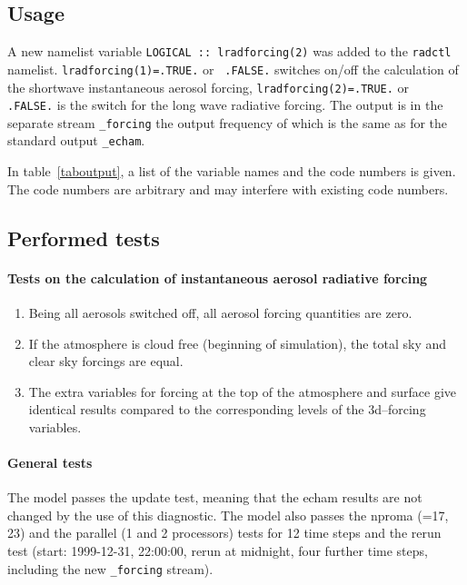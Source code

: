 \begin{appendix}
\subsection{Usage}

A new namelist variable {\tt LOGICAL :: lradforcing(2)} was added 
to the {\tt radctl} namelist. {\tt lradforcing(1)=.TRUE.} or {\tt
  .FALSE.} switches on/off the calculation of the shortwave
instantaneous aerosol forcing, {\tt lradforcing(2)=.TRUE.} or {\tt
  .FALSE.} is the switch for the long wave radiative forcing.
The output is in the separate stream {\tt \_forcing} the output
frequency of which is the same as for the standard output {\tt \_echam}.

In table~\ref{taboutput}, a list of the variable names and the code
numbers is given. The code numbers are arbitrary and may interfere
with existing code numbers.

\subsection{Performed tests}

\paragraph{Tests on the calculation of instantaneous aerosol radiative
  forcing}
\begin{enumerate}
\item Being all aerosols switched off, all aerosol forcing quantities are zero.
\item If the atmosphere is cloud free (beginning of simulation), the 
   total sky and clear sky forcings are equal.
\item The extra variables for forcing at the top of the atmosphere and surface 
   give identical results compared to the corresponding levels of the
   3d--forcing variables.
\end{enumerate}

\paragraph{General tests}

The model passes the update test, meaning that the echam results are
not changed by the use of this diagnostic. The model also passes 
the nproma (=17, 23) and the 
parallel (1 and 2 processors) tests for 12 time steps 
and the rerun test (start: 1999-12-31, 22:00:00, rerun at midnight, 
four further time steps, including the new {\tt \_forcing} stream).



\end{appendix}
